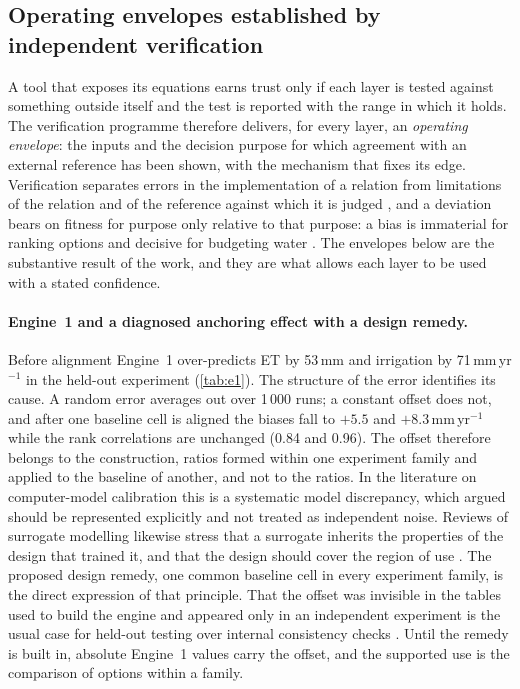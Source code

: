 \subsection{Operating envelopes established by independent verification}
\label{sec:discrep}
A tool that exposes its equations earns trust only if each layer is tested against something outside itself and the test is reported with the range in which it holds. The verification programme therefore delivers, for every layer, an \emph{operating envelope}: the inputs and the decision purpose for which agreement with an external reference has been shown, with the mechanism that fixes its edge. Verification separates errors in the implementation of a relation from limitations of the relation and of the reference against which it is judged \citep{Oreskes1994,Refsgaard2004}, and a deviation bears on fitness for purpose only relative to that purpose: a bias is immaterial for ranking options and decisive for budgeting water \citep{Bennett2013,Moriasi2007}. The envelopes below are the substantive result of the work, and they are what allows each layer to be used with a stated confidence.

\paragraph{Engine~1 and a diagnosed anchoring effect with a design remedy.} Before alignment Engine~1 over-predicts ET by 53\,mm and irrigation by 71\,mm\,yr$^{-1}$ in the held-out experiment (\cref{tab:e1}). The structure of the error identifies its cause. A random error averages out over 1\,000 runs; a constant offset does not, and after one baseline cell is aligned the biases fall to $+5.5$ and $+8.3$\,mm\,yr$^{-1}$ while the rank correlations are unchanged (0.84 and 0.96). The offset therefore belongs to the construction, ratios formed within one experiment family and applied to the baseline of another, and not to the ratios. In the literature on computer-model calibration this is a systematic model discrepancy, which \citet{Kennedy2001} argued should be represented explicitly and not treated as independent noise. Reviews of surrogate modelling likewise stress that a surrogate inherits the properties of the design that trained it, and that the design should cover the region of use \citep{Sacks1989,Razavi2012,Asher2015}. The proposed design remedy, one common baseline cell in every experiment family, is the direct expression of that principle. That the offset was invisible in the tables used to build the engine and appeared only in an independent experiment is the usual case for held-out testing over internal consistency checks \citep{Oreskes1994,Bennett2013}. Until the remedy is built in, absolute Engine~1 values carry the offset, and the supported use is the comparison of options within a family.

